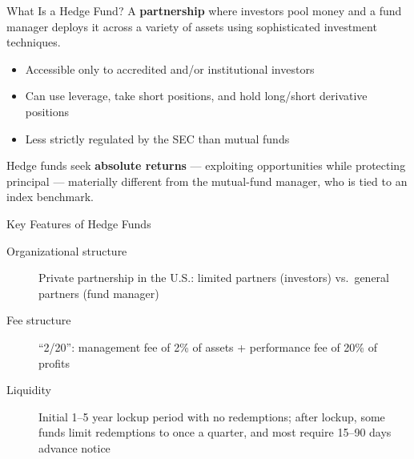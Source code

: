 \documentclass[aspectratio=169]{beamer}
\begin{document}
\begin{frame}{What Is a Hedge Fund?}
A \textbf{partnership} where investors pool money and a fund manager deploys it across a variety of assets using sophisticated investment techniques.
\begin{itemize}
  \item Accessible only to accredited and/or institutional investors
  \item Can use leverage, take short positions, and hold long/short derivative positions
  \item Less strictly regulated by the SEC than mutual funds
\end{itemize}
\vspace{0.3em}
Hedge funds seek \textbf{absolute returns} --- exploiting opportunities while protecting principal --- materially different from the mutual-fund manager, who is tied to an index benchmark.
\end{frame}

\begin{frame}{Key Features of Hedge Funds}
\begin{description}
  \item[Organizational structure] Private partnership in the U.S.: limited partners (investors) vs.\ general partners (fund manager)
  \item[Fee structure] ``2/20'': management fee of 2\% of assets + performance fee of 20\% of profits
  \item[Liquidity] Initial 1--5 year lockup period with no redemptions; after lockup, some funds limit redemptions to once a quarter, and most require 15--90 days advance notice
\end{description}
\end{frame}
\end{document}
